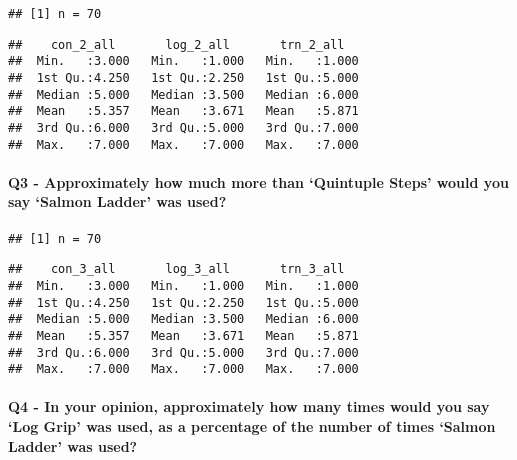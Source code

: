 \documentclass[
]{article}
\begin{document}
\begin{verbatim}
## [1] n = 70
\end{verbatim}

\begin{verbatim}
##    con_2_all       log_2_all       trn_2_all    
##  Min.   :3.000   Min.   :1.000   Min.   :1.000  
##  1st Qu.:4.250   1st Qu.:2.250   1st Qu.:5.000  
##  Median :5.000   Median :3.500   Median :6.000  
##  Mean   :5.357   Mean   :3.671   Mean   :5.871  
##  3rd Qu.:6.000   3rd Qu.:5.000   3rd Qu.:7.000  
##  Max.   :7.000   Max.   :7.000   Max.   :7.000
\end{verbatim}

\hypertarget{q3---approximately-how-much-more-than-quintuple-steps-would-you-say-salmon-ladder-was-used}{%
\paragraph{\texorpdfstring{\textbf{Q3 - Approximately how much more than
`Quintuple Steps' would you say `Salmon Ladder' was
used?}}{Q3 - Approximately how much more than `Quintuple Steps' would you say `Salmon Ladder' was used?}}\label{q3---approximately-how-much-more-than-quintuple-steps-would-you-say-salmon-ladder-was-used}}

\begin{verbatim}
## [1] n = 70
\end{verbatim}

\begin{verbatim}
##    con_3_all       log_3_all       trn_3_all    
##  Min.   :3.000   Min.   :1.000   Min.   :1.000  
##  1st Qu.:4.250   1st Qu.:2.250   1st Qu.:5.000  
##  Median :5.000   Median :3.500   Median :6.000  
##  Mean   :5.357   Mean   :3.671   Mean   :5.871  
##  3rd Qu.:6.000   3rd Qu.:5.000   3rd Qu.:7.000  
##  Max.   :7.000   Max.   :7.000   Max.   :7.000
\end{verbatim}

\hypertarget{q4---in-your-opinion-approximately-how-many-times-would-you-say-log-grip-was-used-as-a-percentage-of-the-number-of-times-salmon-ladder-was-used}{%
\paragraph{\texorpdfstring{\textbf{Q4 - In your opinion, approximately
how many times would you say `Log Grip' was used, as a percentage of the
number of times `Salmon Ladder' was
used?}}{Q4 - In your opinion, approximately how many times would you say `Log Grip' was used, as a percentage of the number of times `Salmon Ladder' was used?}}\label{q4---in-your-opinion-approximately-how-many-times-would-you-say-log-grip-was-used-as-a-percentage-of-the-number-of-times-salmon-ladder-was-used}}
\end{document}
